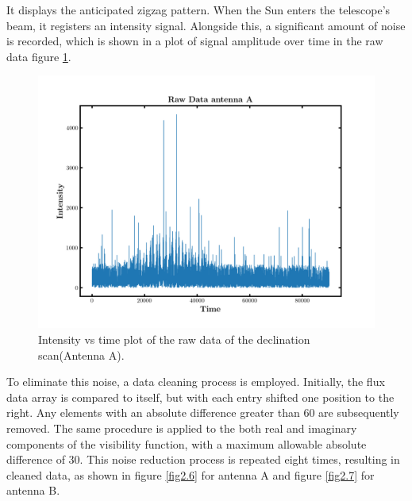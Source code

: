 \documentclass[12pt]{article}
\begin{document}
 It displays the anticipated zigzag pattern. When the Sun enters the telescope's beam, it registers an intensity signal. Alongside this, a significant amount of noise is recorded, which is shown in a plot of signal amplitude over time in the raw data figure \ref{fig2.5}.

 \begin{figure}[H]
 \centering
 \includegraphics[scale=.6]{fig/Raw_Data_antena_A.png}
 \caption{Intensity vs time plot of the raw data of the declination scan(Antenna A).}
 \label{fig2.5}
 \end{figure}

 To eliminate this noise, a data cleaning process is employed\parencite{lecturenote}. Initially, the flux data array is compared to itself, but with each entry shifted one position to the right. Any elements with an absolute difference greater than 60 are subsequently removed. The same procedure is applied to the both real and imaginary components of the visibility function, with a maximum allowable absolute difference of 30. This noise reduction process is repeated eight times, resulting in cleaned data, as shown in figure \ref{fig2.6} for antenna A and figure \ref{fig2.7} for antenna B.
\end{document}

